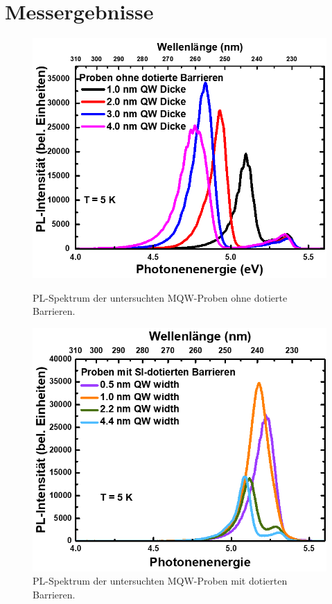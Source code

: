 \section{Messergebnisse}
\begin{figure}[H]
  \centering
  \begin{minipage}[t]{0.49\textwidth}
    \centering
    \includegraphics[width=\textwidth]{Bilder/MQWdickenSerie/spektrumUndotiert}
		\caption{PL-Spektrum der untersuchten MQW-Proben ohne dotierte Barrieren.}
    \label{fig:undotiertSpektrum}
  \end{minipage}
	\hfill
  \begin{minipage}[t]{0.49\textwidth}
    \centering
    \includegraphics[width=\linewidth]{Bilder/MQWdickenSerie/spektrumDotiert}
		\caption{PL-Spektrum der untersuchten MQW-Proben mit dotierten Barrieren.}
    \label{fig:dotiertSpektrum}
  \end{minipage}
\end{figure}
